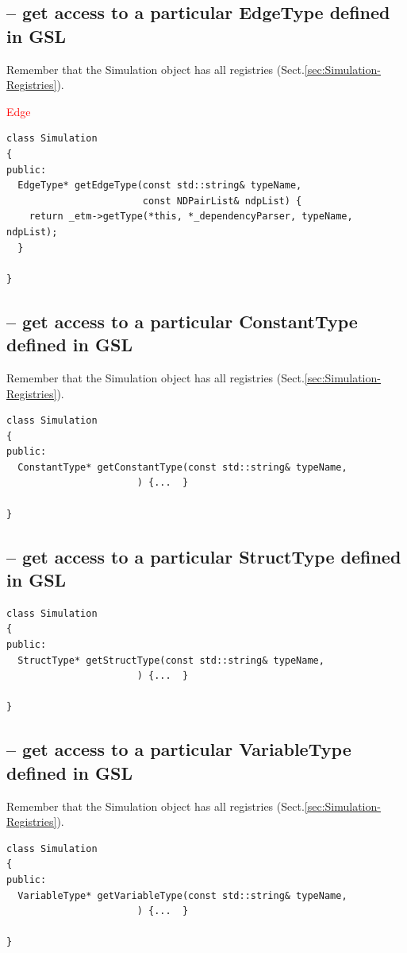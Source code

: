 \subsection{-- get access to a particular EdgeType defined in GSL}

Remember that the Simulation object has all registries
(Sect.\ref{sec:Simulation-Registries}).

\textcolor{red}{Edge}
\begin{lstlisting}
class Simulation
{
public:
  EdgeType* getEdgeType(const std::string& typeName,
                        const NDPairList& ndpList) {
    return _etm->getType(*this, *_dependencyParser, typeName, ndpList);
  }

}
\end{lstlisting}

\subsection{-- get access to a particular ConstantType defined in GSL}

Remember that the Simulation object has all registries
(Sect.\ref{sec:Simulation-Registries}).
\begin{lstlisting}
class Simulation
{
public:
  ConstantType* getConstantType(const std::string& typeName,
                       ) {...  }

}
\end{lstlisting}

\subsection{-- get access to a particular StructType defined in GSL}

\begin{lstlisting}
class Simulation
{
public:
  StructType* getStructType(const std::string& typeName,
                       ) {...  }

}
\end{lstlisting}


\subsection{-- get access to a particular VariableType defined in GSL}

Remember that the Simulation object has all registries
(Sect.\ref{sec:Simulation-Registries}).
\begin{lstlisting}
class Simulation
{
public:
  VariableType* getVariableType(const std::string& typeName,
                       ) {...  }

}
\end{lstlisting}

